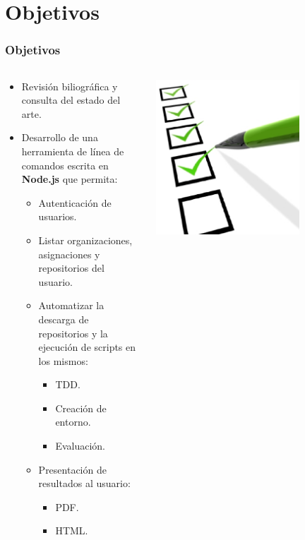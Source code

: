 \documentclass{beamer}
\begin{document}
\section{Objetivos}
\begin{frame}
  \frametitle{Objetivos}
  
  \begin{columns}
    \begin{column}{9cm}
      \begin{itemize}
        \item Revisión biliográfica y consulta del estado del arte.
        \item Desarrollo de una herramienta de línea de comandos escrita en {\bfseries Node.js} que permita: 
        \begin{itemize}
          \item Autenticación de usuarios.
          \item Listar organizaciones, asignaciones y repositorios del usuario.
          \item Automatizar la descarga de repositorios y la ejecución de scripts en los mismos:
          \begin{itemize}
             \item TDD.
             \item Creación de entorno.
             \item Evaluación.
          \end{itemize}
          \item Presentación de resultados al usuario:
          \begin{itemize}
             \item PDF.
             \item HTML.
          \end{itemize}
        \end{itemize}
      \end{itemize}
    \end{column}
    \begin{column}{5cm}
      \includegraphics[width=0.7\textwidth]{images/checklist.eps}
    \end{column}
  \end{columns}
  

\end{frame}
\end{document}
